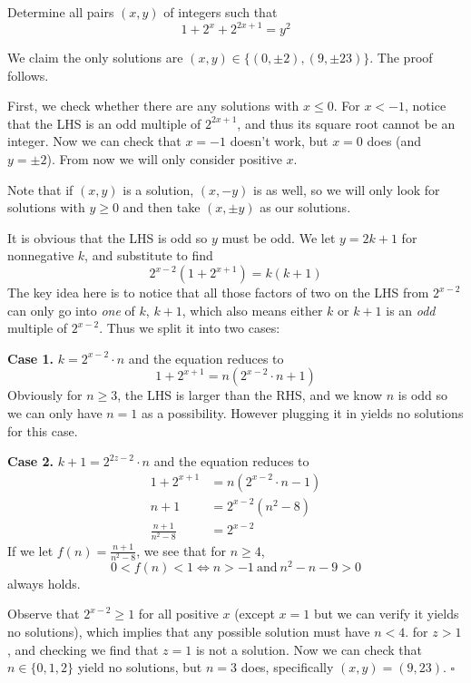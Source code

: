 
\begin{problem}[ISL 2006 N1]
    Determine all pairs $(x, y)$ of integers such that
    \[1+2^x+2^{2x+1}= y^2\]
\end{problem}

\begin{solution}
    We claim the only solutions are $(x, y) \in \{(0, \pm2), (9, \pm23)\}$. The proof follows.
    
    First, we check whether there are any solutions with $x \leq 0$. For $x < -1$, notice that the LHS is an odd multiple of $2^{2x+1}$, and thus its square root cannot be an integer. Now we can check that $x=-1$ doesn't work, but $x=0$ does (and $y=\pm2$). From now we will only consider positive $x$.
    
    Note that if $(x, y)$ is a solution, $(x, -y)$ is as well, so we will only look for solutions with $y \geq 0$ and then take $(x, \pm y)$ as our solutions.
    
    It is obvious that the LHS is odd so $y$ must be odd. We let $y = 2k+1$ for nonnegative $k$, and substitute to find \[2^{x-2}(1 + 2^{x+1}) = k(k+1)\]
    The key idea here is to notice that all those factors of two on the LHS from $2^{x-2}$ can only go into \textit{one} of $k$, $k+1$, which also means either $k$ or $k+1$ is an \textit{odd} multiple of $2^{x-2}$. Thus we split it into two cases:
    
    \textbf{Case 1.} $k = 2^{x-2} \cdot n$ and the equation reduces to
    \[1 + 2^{x+1} = n(2^{x-2} \cdot n + 1)\]
    Obviously for $n \geq 3$, the LHS is larger than the RHS, and we know $n$ is odd so we can only have $n=1$ as a possibility. However plugging it in yields no solutions for this case.
    
    \textbf{Case 2.} $k+1 = 2^{2z-2} \cdot n$ and the equation reduces to \begin{align*}
    1 + 2^{x+1} &= n(2^{x-2} \cdot n - 1)\\
    n+1 &= 2^{x-2}(n^2-8)\\
    \frac{n+1}{n^2-8} &= 2^{x-2}
    \end{align*}
    If we let $f(n) = \frac{n+1}{n^2-8}$, we see that for $n \geq 4$, \[0 < f(n) < 1 \Longleftrightarrow n > -1\mathrm{~and~}n^2-n-9 > 0\] always holds.
    
    Observe that $2^{x-2} \geq 1$ for all positive $x$ (except $x=1$ but we can verify it yields no solutions), which implies that any possible solution must have $n < 4$. for $z > 1$, and checking we find that $z=1$ is not a solution. Now we can check that $n \in \{0, 1, 2\}$ yield no solutions, but $n = 3$ does, specifically $(x, y) = (9, 23)$. $\square$
\end{solution}
